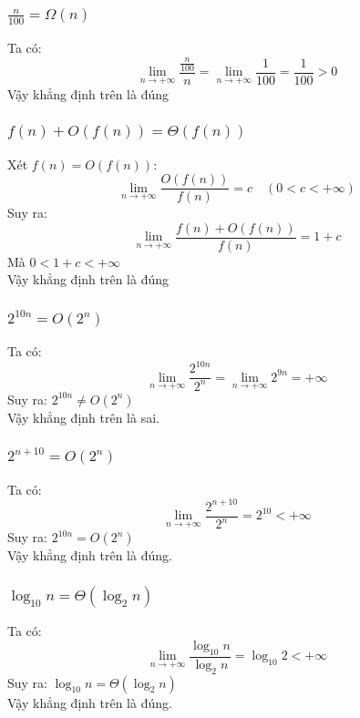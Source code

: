 \subsubsection{$\displaystyle \frac{n}{100}=\Omega(n)$}
Ta có: $$\lim_{n \to +\infty} \frac{\frac{n}{100}}{n}=\lim_{n \to +\infty} \frac{1}{100} = \frac{1}{100} > 0 $$
Vậy khẳng định trên là đúng
\subsubsection{$f(n) + O(f(n)) = \Theta(f(n))$}
Xét $f(n) = O(f(n))$:$$\lim_{n \to +\infty} \frac{O(f(n))}{f(n)} = c \quad (0 < c < +\infty)$$
Suy ra: $$\lim_{n \to +\infty} \frac{f(n) + O(f(n))}{f(n)} = 1 + c$$
Mà $0 < 1 + c < +\infty$\\
Vậy khẳng định trên là đúng
\subsubsection{$2^{10n}=O(2^n)$}
Ta có: $$\lim_{n \to +\infty} \frac{2^{10n}}{2^n} =\lim_{n \to +\infty} 2^{9n} = +\infty $$
Suy ra: $2^{10n} \ne O(2^n)$\\
Vậy khẳng định trên là sai.
\subsubsection{$2^{n+10}=O(2^n)$}
Ta có: $$\lim_{n \to +\infty} \frac{2^{n+10}}{2^n} =2^{10} < +\infty $$
Suy ra: $2^{10n} = O(2^n)$\\
Vậy khẳng định trên là đúng.
\subsubsection{$\log_{10} n = \Theta(\log_2 n)$}
Ta có: $$\lim_{n \to +\infty} \frac{\log_{10} n}{\log_2 n} = \log_{10} 2 < +\infty$$
Suy ra: $\log_{10} n = \Theta(\log_2 n)$\\
Vậy khẳng định trên là đúng.
